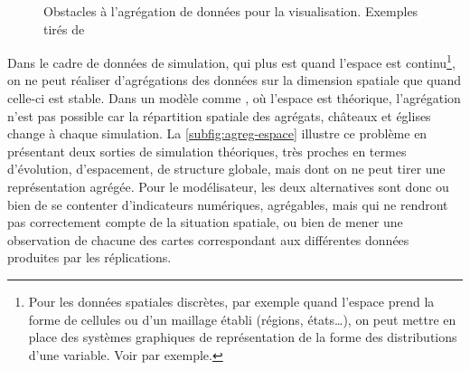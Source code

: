 \begin{figure}[H]
	\centering
	\hspace{5pt}
	\captionsetup[subfloat]{width=.55\linewidth}
	\captionsetup[subfloat]{width=.33\linewidth}
	\caption[Obstacles à l'agrégation de données pour la visualisation.]{Obstacles à l'agrégation de données pour la visualisation. Exemples tirés de \textcite{cura_visualisation_2020}}
\end{figure}


\noindent Dans le cadre de données de simulation, qui plus est quand l'espace est continu\footnote{
	Pour les données spatiales discrètes, par exemple quand l'espace prend la forme de cellules ou d'un maillage établi (régions, états\ldots), on peut mettre en place des systèmes graphiques de représentation de la forme des distributions d'une variable.
	Voir \textcite{ribecca_chart_2018} par exemple.
}, on ne peut réaliser d'agrégations des données sur la dimension spatiale que quand celle-ci est stable.
Dans un modèle comme \simfeodal{}, où l'espace est théorique, l'agrégation n'est pas possible car la répartition spatiale des agrégats, châteaux et églises change à chaque simulation.
La \cref{subfig:agreg-espace} illustre ce problème en présentant deux sorties de simulation théoriques, très proches en termes d'évolution, d'espacement, de structure globale, mais dont on ne peut tirer une représentation agrégée.
Pour le modélisateur, les deux alternatives sont donc ou bien de se contenter d'indicateurs numériques, agrégables, mais qui ne rendront pas correctement compte de la situation spatiale, ou bien de mener une observation de chacune des cartes correspondant aux différentes données produites par les réplications.


